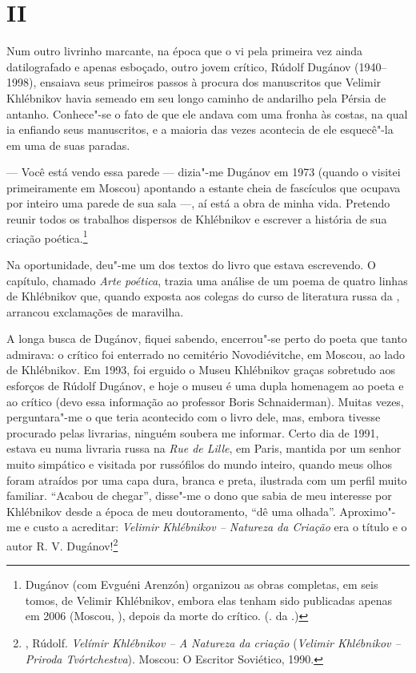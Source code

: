 \section{\uppercase{II}}

Num outro livrinho marcante, na época que o vi pela primeira vez ainda datilografado e apenas
esboçado, outro jovem crítico, Rúdolf Dugánov (1940--1998), ensaiava seus primeiros
passos à procura dos manuscritos que Velimir Khlébnikov
havia semeado em seu longo caminho de andarilho pela Pérsia de
antanho. Conhece"-se o fato de que ele andava com uma fronha às costas, na
qual ia enfiando seus manuscritos, e a maioria das vezes acontecia de
ele esquecê"-la em uma de suas paradas.

--- Você está vendo essa parede --- dizia"-me Dugánov em 1973 (quando o visitei
primeiramente em Moscou) apontando a estante cheia de fascículos que
ocupava por inteiro uma parede de sua sala ---, aí está a obra
de minha vida. Pretendo reunir todos os trabalhos dispersos de Khlébnikov
e escrever a história de sua criação poética.\footnote{Dugánov (com
  Evguéni Arenzón) organizou as obras completas, em seis tomos, de
  Velimir Khlébnikov, embora elas tenham sido publicadas apenas em 2006
  (Moscou, ), depois da morte do crítico. (. da .)}

Na oportunidade, deu"-me um dos textos do livro que estava escrevendo. O
capítulo, chamado \emph{Arte poética}, trazia uma análise de um poema
de quatro linhas de Khlébnikov que, quando exposta aos colegas do curso
de literatura russa da , arrancou exclamações de maravilha.

A longa busca de Dugánov, fiquei sabendo, encerrou"-se perto do poeta que
tanto admirava: o crítico foi enterrado no cemitério Novodiévitche, em
Moscou, ao lado de Khlébnikov. Em 1993, foi erguido o Museu
Khlébnikov graças sobretudo aos esforços de Rúdolf Dugánov, e hoje o museu é uma
dupla homenagem ao poeta e ao crítico (devo
essa informação ao professor Boris Schnaiderman). Muitas vezes,
perguntara"-me o que teria acontecido com o livro dele, mas, embora
tivesse procurado pelas livrarias, ninguém soubera me informar. Certo
dia de 1991, estava eu numa livraria russa na \emph{Rue de Lille}, em Paris,
mantida por um senhor muito simpático e
visitada por russófilos do mundo inteiro, quando meus olhos foram
atraídos por uma capa dura, branca e preta, ilustrada com um perfil muito
familiar. ``Acabou de chegar'', disse"-me o dono que sabia de meu
interesse por Khlébnikov desde a época de meu doutoramento, ``dê uma
olhada''. Aproximo"-me e custo a acreditar: \emph{Velimir Khlébnikov -- Natureza da Criação} era o título e o autor R. V.
Dugánov!\footnote{, Rúdolf. \emph{Velímir Khlébnikov -- A
Natureza da criação} (\emph{Velimir Khlébnikov -- Priroda
Tvórtchestva}). Moscou: O Escritor Soviético, 1990.}

